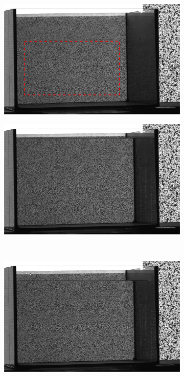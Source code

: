 \documentclass{svjour3}                     %
\begin{document}
\begin{figure}[htbp]
\begin{subfigure}{.5\linewidth}
		\centering \includegraphics[width = \textwidth]{TL_air}
		\label{fig:air0side}
\end{subfigure}%
\begin{subfigure}{.5\linewidth}
		\centering \includegraphics[width = \textwidth]{TL_fresh}
	\label{fig:fresh0side}
\end{subfigure}\\
\begin{subfigure}{.5\linewidth}
		\centering \includegraphics[width = \textwidth]{TL_TL}

\end{subfigure}
\end{figure}
\end{document}

